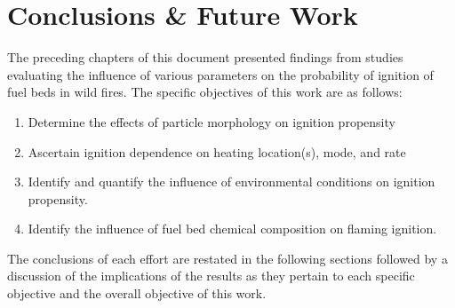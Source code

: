 
\chapter{Conclusions \& Future Work}
\label{chap:conclusion}
The preceding chapters of this document presented findings from studies evaluating the influence of various parameters on the probability of ignition of fuel beds in wild fires. The specific objectives of this work are as follows:
        \begin{enumerate}
            \item Determine the effects of particle morphology on ignition propensity
            \item Ascertain ignition dependence on heating location(s), mode, and rate
            \item Identify and quantify the influence of environmental conditions on ignition propensity.
            \item Identify the influence of fuel bed chemical composition on flaming ignition.
        \end{enumerate}
The conclusions of each effort are restated in the following sections followed by a discussion of the implications of the results as they pertain to each specific objective and the overall objective of this work.

